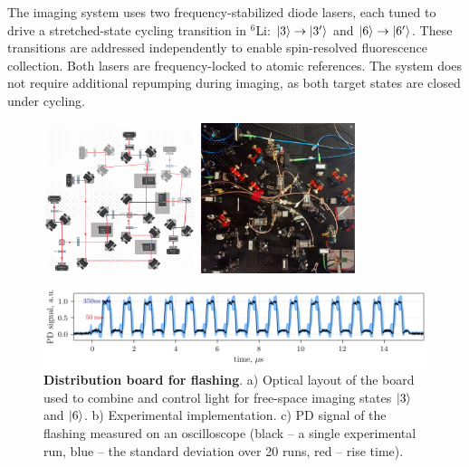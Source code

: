 
The imaging system uses two frequency-stabilized diode lasers, each tuned to drive a stretched-state cycling transition in ${}^6$Li: $\left| 3 \right\rangle \rightarrow \left| 3' \right\rangle$ and $\left| 6 \right\rangle \rightarrow \left| 6' \right\rangle$. These transitions are addressed independently to enable spin-resolved fluorescence collection. Both lasers are frequency-locked to atomic references. The system does not require additional repumping during imaging, as both target states are closed under cycling.


\begin{figure}
    \centering
     \phantom{4}
    \includegraphics[width=0.4\textwidth]{fig-ai/flashing-distribution-scheme.pdf}
    \hspace{10 mm} 
     \phantom{4}
    \includegraphics[width=0.4\textwidth]{imgs/flashing-distribution-img.jpg}

    \includegraphics{fig-py/flashing-oscilloscope.pdf}

    \caption[Distribution board for flashing]{
        \textbf{Distribution board for flashing}. 
        a) Optical layout of the board used to combine and control light for free-space imaging states $\left| 3 \right\rangle$ and $\left| 6 \right\rangle$.
        b) Experimental implementation.
        c) PD signal of the flashing measured on an oscilloscope (black -- a single experimental run, blue -- the standard deviation over 20 runs, red -- rise time).
    }
    \label{fig:flashing}
\end{figure}

